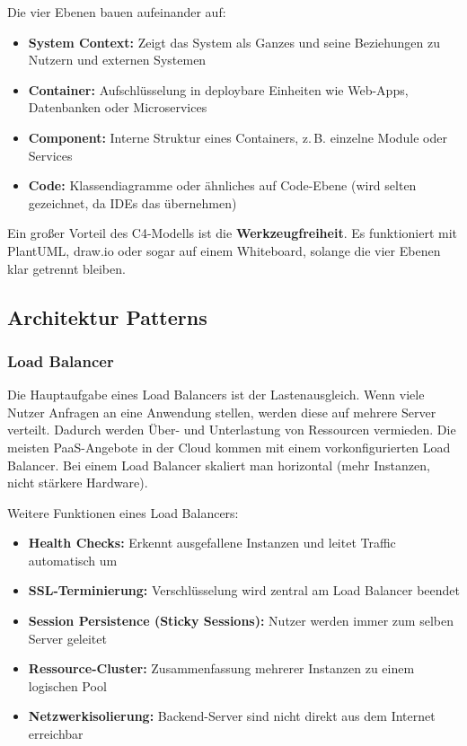 Die vier Ebenen bauen aufeinander auf:
\begin{itemize}
    \item \textbf{System Context:} Zeigt das System als Ganzes
          und seine Beziehungen zu Nutzern und externen Systemen
    \item \textbf{Container:} Aufschlüsselung in deploybare Einheiten
          wie Web-Apps, Datenbanken oder Microservices
    \item \textbf{Component:} Interne Struktur eines Containers,
          z.\,B. einzelne Module oder Services
    \item \textbf{Code:} Klassendiagramme oder ähnliches auf
          Code-Ebene (wird selten gezeichnet, da IDEs das übernehmen)
\end{itemize}

Ein großer Vorteil des C4-Modells ist die \textbf{Werkzeugfreiheit}.
Es funktioniert mit PlantUML, draw.io oder sogar auf einem Whiteboard,
solange die vier Ebenen klar getrennt bleiben.

\subsection{Architektur Patterns}

\subsubsection{Load Balancer}
Die Hauptaufgabe eines Load Balancers ist der Lastenausgleich. Wenn viele Nutzer Anfragen an eine Anwendung stellen, werden diese auf mehrere Server verteilt. Dadurch werden Über- und Unterlastung von Ressourcen vermieden. Die meisten PaaS-Angebote in der Cloud kommen mit einem vorkonfigurierten Load Balancer. Bei einem Load Balancer skaliert man horizontal (mehr Instanzen, nicht stärkere Hardware).

Weitere Funktionen eines Load Balancers:
\begin{itemize}
    \item \textbf{Health Checks:} Erkennt ausgefallene Instanzen und leitet Traffic automatisch um
    \item \textbf{SSL-Terminierung:} Verschlüsselung wird zentral am Load Balancer beendet
    \item \textbf{Session Persistence (Sticky Sessions):} Nutzer werden immer zum selben Server geleitet
    \item \textbf{Ressource-Cluster:} Zusammenfassung mehrerer Instanzen zu einem logischen Pool
    \item \textbf{Netzwerkisolierung:} Backend-Server sind nicht direkt aus dem Internet erreichbar
\end{itemize}

